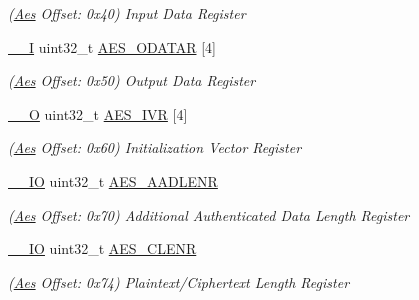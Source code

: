 \begin{DoxyCompactItemize}
\begin{DoxyCompactList}\small\item\em (\mbox{\hyperlink{structAes}{Aes}} Offset\+: 0x40) Input Data Register \end{DoxyCompactList}\item 
\mbox{\label{structAes_acdd5b4ee5619ac3d23ff200c132910d8}} 
\mbox{\hyperlink{core__cm7_8h_af63697ed9952cc71e1225efe205f6cd3}{\+\_\+\+\_\+I}} uint32\+\_\+t \mbox{\hyperlink{structAes_acdd5b4ee5619ac3d23ff200c132910d8}{A\+E\+S\+\_\+\+O\+D\+A\+T\+AR}} \mbox{[}4\mbox{]}
\begin{DoxyCompactList}\small\item\em (\mbox{\hyperlink{structAes}{Aes}} Offset\+: 0x50) Output Data Register \end{DoxyCompactList}\item 
\mbox{\label{structAes_a0085fbdb0fe284d6a50eda6be779c819}} 
\mbox{\hyperlink{core__cm7_8h_a7e25d9380f9ef903923964322e71f2f6}{\+\_\+\+\_\+O}} uint32\+\_\+t \mbox{\hyperlink{structAes_a0085fbdb0fe284d6a50eda6be779c819}{A\+E\+S\+\_\+\+I\+VR}} \mbox{[}4\mbox{]}
\begin{DoxyCompactList}\small\item\em (\mbox{\hyperlink{structAes}{Aes}} Offset\+: 0x60) Initialization Vector Register \end{DoxyCompactList}\item 
\mbox{\label{structAes_a2f0b17cb7650ae86668d7cb02f650aea}} 
\mbox{\hyperlink{core__cm7_8h_aec43007d9998a0a0e01faede4133d6be}{\+\_\+\+\_\+\+IO}} uint32\+\_\+t \mbox{\hyperlink{structAes_a2f0b17cb7650ae86668d7cb02f650aea}{A\+E\+S\+\_\+\+A\+A\+D\+L\+E\+NR}}
\begin{DoxyCompactList}\small\item\em (\mbox{\hyperlink{structAes}{Aes}} Offset\+: 0x70) Additional Authenticated Data Length Register \end{DoxyCompactList}\item 
\mbox{\label{structAes_ac53119aade6625b5b91774cc4997691d}} 
\mbox{\hyperlink{core__cm7_8h_aec43007d9998a0a0e01faede4133d6be}{\+\_\+\+\_\+\+IO}} uint32\+\_\+t \mbox{\hyperlink{structAes_ac53119aade6625b5b91774cc4997691d}{A\+E\+S\+\_\+\+C\+L\+E\+NR}}
\begin{DoxyCompactList}\small\item\em (\mbox{\hyperlink{structAes}{Aes}} Offset\+: 0x74) Plaintext/\+Ciphertext Length Register \end{DoxyCompactList}\item 

\end{DoxyCompactItemize}
